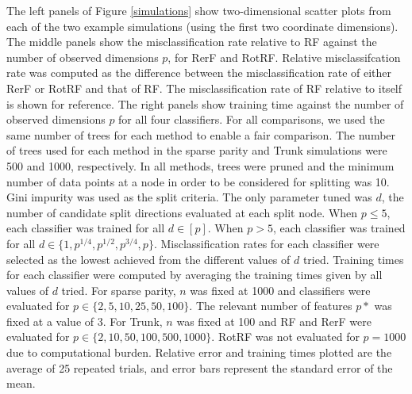\documentclass{article}
\begin{document}
The left panels of Figure \ref{simulations} show two-dimensional scatter plots from each of the two example simulations (using the first two coordinate dimensions). The middle panels show the misclassification rate relative to RF against the number of observed dimensions $p$, for RerF and RotRF. Relative misclassifcation rate was computed as the difference between the misclassification rate of either RerF or RotRF and that of RF. The misclassification rate of RF relative to itself is shown for reference. The right panels show training time against the number of observed dimensions $p$ for all four classifiers. For all comparisons, we used the same number of trees for each method to enable a fair comparison. The number of trees used for each method in the sparse parity and Trunk simulations were 500 and 1000, respectively. In all methods, trees were pruned and the minimum number of data points at a node in order to be considered for splitting was 10. Gini impurity was used as the split criteria. The only parameter tuned was $d$, the number of candidate split directions evaluated at each split node. When $p \leq 5$, each classifier was trained for all $d \in [p]$. When $p > 5$, each classifier was trained for all $d \in \{1,p^{1/4},p^{1/2},p^{3/4},p\}$. Misclassification rates for each classifier were selected as the lowest achieved from the different values of $d$ tried. Training times for each classifier were computed by averaging the training times given by all values of $d$ tried. For sparse parity, $n$ was fixed at 1000 and classifiers were evaluated for $p \in \{2,5,10,25,50,100\}$. The relevant number of features $p*$ was fixed at a value of 3. For Trunk, $n$ was fixed at 100 and RF and RerF were evaluated for $p \in \{2,10,50,100,500,1000\}$. RotRF was not evaluated for $p = 1000$ due to computational burden. Relative error and training times plotted are the average of 25 repeated trials, and error bars represent the standard error of the mean.
\end{document}
